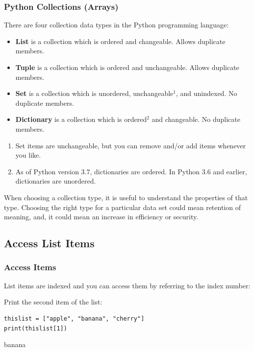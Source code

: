 \documentclass[12pt,a4paper]{article}
\begin{document}
\subsubsection{Python Collections (Arrays)}

There are four collection data types in the Python programming language:

\begin{itemize}
	\item \textbf{List} is a collection which is ordered and changeable. Allows
		duplicate members.
	\item \textbf{Tuple} is a collection which is ordered and unchangeable.
		Allows duplicate members.
	\item \textbf{Set} is a collection which is unordered, unchangeable$^1$, and
		unindexed. No duplicate members.
	\item \textbf{Dictionary} is a collection which is ordered$^2$ and
		changeable. No duplicate members.
\end{itemize}

\begin{nbox}
	\begin{enumerate}
\item Set items are unchangeable, but you can remove and/or add items whenever
	you like.
\item As of Python version 3.7, dictionaries are ordered. In Python 3.6 and
	earlier, dictionaries are unordered.
	\end{enumerate}
\end{nbox}

When choosing a collection type, it is useful to understand the properties of
that type. Choosing the right type for a particular data set could mean
retention of meaning, and, it could mean an increase in efficiency or security.
\subsection{Access List Items}
\subsubsection{Access Items}

List items are indexed and you can access them by referring to the index number:

\begin{ebox}
Print the second item of the list:
	\begin{lstlisting}
thislist = ["apple", "banana", "cherry"]
print(thislist[1])
	\end{lstlisting}
\tcblower
	\begin{vercode}
banana
	\end{vercode}
\end{ebox}
\end{document}

